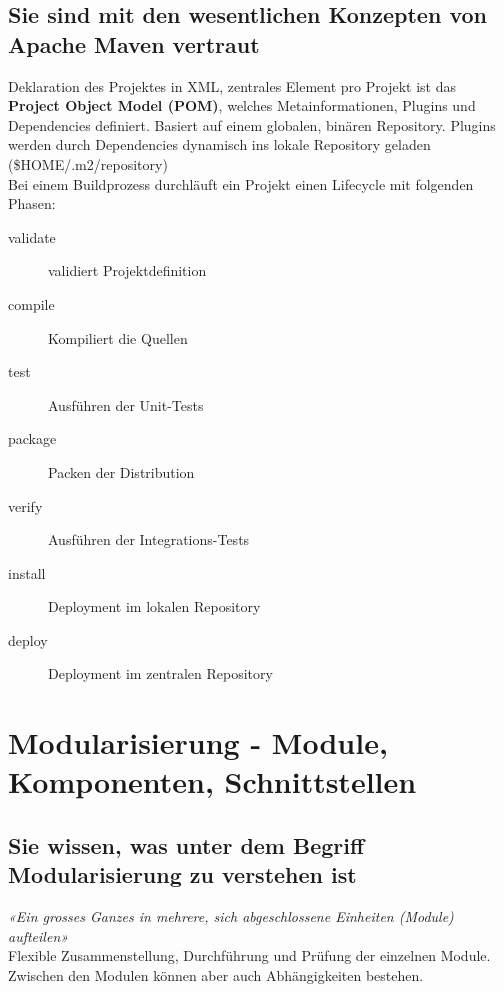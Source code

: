 \documentclass[a4paper]{article}
\begin{document}
		\subsection{Sie sind mit den wesentlichen Konzepten von Apache Maven vertraut}
		Deklaration des Projektes in XML, zentrales Element pro Projekt ist das \textbf{Project Object Model (POM)}, welches Metainformationen, Plugins und Dependencies definiert. Basiert auf einem globalen, binären Repository. Plugins werden durch Dependencies dynamisch ins lokale Repository geladen (\$HOME/.m2/repository)\\
		Bei einem Buildprozess durchläuft ein Projekt einen Lifecycle mit folgenden Phasen:
		\begin{description}
			\item[validate] validiert Projektdefinition
			\item[compile] Kompiliert die Quellen
			\item[test] Ausführen der Unit-Tests
			\item[package] Packen der Distribution
			\item[verify] Ausführen der Integrations-Tests
			\item[install] Deployment im lokalen Repository
			\item[deploy] Deployment im zentralen Repository
		\end{description}

	\newpage
	\section{Modularisierung - Module, Komponenten, Schnittstellen}
	
	\subsection{Sie wissen, was unter dem Begriff Modularisierung zu verstehen ist}
	\textit{«Ein grosses Ganzes in mehrere, sich abgeschlossene Einheiten (Module) aufteilen»} \\
	Flexible Zusammenstellung, Durchführung und Prüfung der einzelnen Module. Zwischen den Modulen können aber auch Abhängigkeiten bestehen.
	
\end{document}
